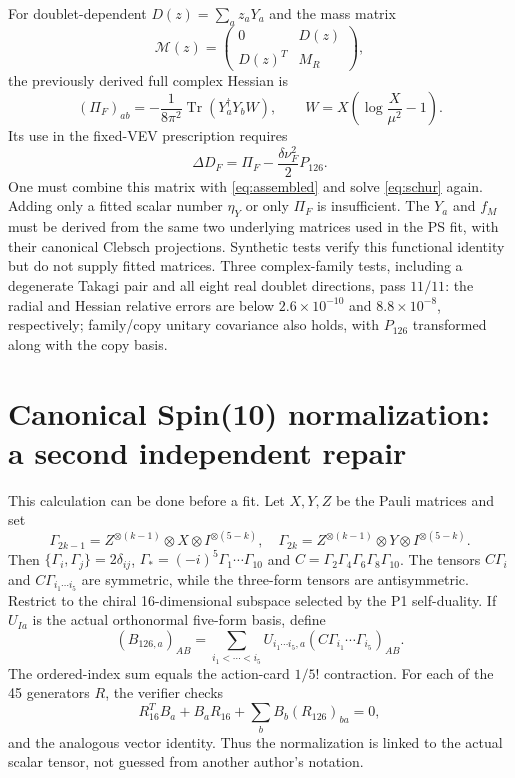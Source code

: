 \documentclass[11pt]{article}
\newcommand{\tr}{\operatorname{Tr}}
\begin{document}
For doublet-dependent $D(z)=\sum_a z_aY_a$ and the mass matrix
\begin{equation}
 \mathcal M(z)=\begin{pmatrix}0&D(z)\\D(z)^T&M_R\end{pmatrix},
\end{equation}
the previously derived full complex Hessian is
\begin{equation}
 (\Pi_F)_{ab}=-\frac1{8\pi^2}\tr(Y_a^\dagger Y_b W),\qquad
 W=X\left(\log\frac{X}{\mu^2}-1\right).
\end{equation}
Its use in the fixed-VEV prescription requires
\begin{equation}
 \boxed{\Delta D_F=\Pi_F-\frac{\delta\nu_F^2}{2}P_{126}.}
\end{equation}
One must combine this matrix with \eqref{eq:assembled} and solve
\eqref{eq:schur} again. Adding only a fitted scalar number $\eta_Y$ or only
$\Pi_F$ is insufficient. The $Y_a$ and $f_M$ must be derived from the
same two underlying matrices used in the PS fit, with their canonical
Clebsch projections. Synthetic tests verify this functional identity but
do not supply fitted matrices. Three complex-family tests, including a
degenerate Takagi pair and all eight real doublet directions, pass
$11/11$: the radial and Hessian relative errors are below
$2.6\times10^{-10}$ and $8.8\times10^{-8}$, respectively; family/copy
unitary covariance also holds, with $P_{126}$ transformed along with the
copy basis.

\section{Canonical Spin(10) normalization: a second independent repair}
This calculation can be done before a fit. Let $X,Y,Z$ be the Pauli
matrices and set
\begin{equation}
 \Gamma_{2k-1}=Z^{\otimes(k-1)}\otimes X\otimes I^{\otimes(5-k)},\quad
 \Gamma_{2k}=Z^{\otimes(k-1)}\otimes Y\otimes I^{\otimes(5-k)}.
\end{equation}
Then $\{\Gamma_i,\Gamma_j\}=2\delta_{ij}$,
$\Gamma_*=(-i)^5\Gamma_1\cdots\Gamma_{10}$ and
$C=\Gamma_2\Gamma_4\Gamma_6\Gamma_8\Gamma_{10}$.
The tensors $C\Gamma_i$ and $C\Gamma_{i_1\cdots i_5}$ are symmetric,
while the three-form tensors are antisymmetric. Restrict to the chiral
16-dimensional subspace selected by the P1 self-duality. If $U_{Ia}$ is
the actual orthonormal five-form basis, define
\begin{equation}
 (B_{126,a})_{AB}=\sum_{i_1<\cdots<i_5}U_{i_1\cdots i_5,a}
 (C\Gamma_{i_1}\cdots\Gamma_{i_5})_{AB}.
\end{equation}
The ordered-index sum equals the action-card $1/5!$ contraction.
For each of the 45 generators $R$, the verifier checks
\begin{equation}
 R_{16}^TB_a+B_aR_{16}+\sum_b B_b(R_{126})_{ba}=0,
\end{equation}
and the analogous vector identity. Thus the normalization is linked to
the actual scalar tensor, not guessed from another author's notation.
\end{document}

